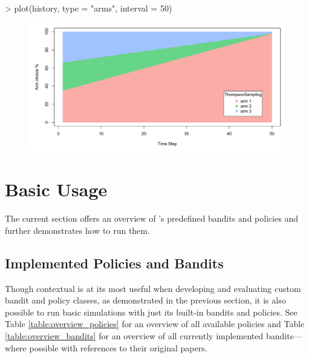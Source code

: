 \documentclass{jss}
\begin{document}
\begin{CodeChunk}
\begin{CodeInput}
> plot(history, type = "arms", interval = 50)
\end{CodeInput}
\end{CodeChunk}
\begin{figure}[H]
\centering
\includegraphics[width=.99\textwidth]{fig/section_2_3}
\label{fig:section_2_3}
\end{figure}


\section{Basic Usage} \label{basicusage}

The current section offers an overview of 's predefined bandits and policies and further demonstrates how to run them.

\subsection{Implemented Policies and Bandits} \label{implbp}

Though contextual is at its most useful when developing and evaluating custom bandit and policy classes, as demonstrated in the previous section, it is also possible to run basic simulations with just its built-in bandits and policies. See Table \ref{table:overview_policies} for an overview of all available policies and Table \ref{table:overview_bandits} for an overview of all currently implemented bandits---where possible with references to their original papers.
\end{document}

